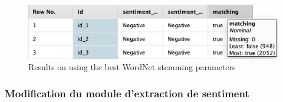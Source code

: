 \documentclass[a4paper]{article}
\begin{document}
\begin{figure}[H]
	\includegraphics[width=\linewidth]{imgs/part_3/3_processing_documents_with_stem_wordnet_best_results}
	\caption{Results on using the best WordNet stemming parameters}
	\label{fig:3_processing_documents_with_stem_wordnet_best_results}
\end{figure}


\vspace{6pt}
\subsubsection{Modification du module d'extraction de sentiment}
\end{document}
